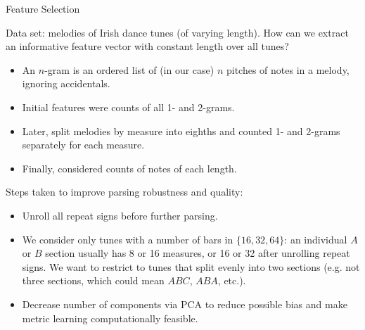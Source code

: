 \documentclass[letterpaper]{amsart}
\begin{document}
\begin{center}
\Huge
Feature Selection
\end{center}
\huge

Data set: melodies of Irish dance tunes (of varying length). How can we extract
an informative feature vector with constant length over all tunes?
\begin{itemize}
\item An $n$-gram is an ordered list of (in our case) $n$ pitches of notes in a melody, ignoring accidentals.

\item Initial features were counts of all 1- and 2-grams.

\item Later, split melodies by measure into eighths and counted 1- and 2-grams separately for each measure.

\item Finally, considered counts of notes of each length.
\end{itemize}

Steps taken to improve parsing robustness and quality:
\begin{itemize}
\item Unroll all repeat signs before further parsing.

\item We consider only tunes with a number of bars in $\{16, 32, 64\}$: an individual $A$ or $B$ section usually has 8 or 16 measures, or 16 or 32 after unrolling repeat signs. We want to restrict to tunes that split evenly into two sections (e.g. not three sections, which could mean $ABC$, $ABA$, etc.).

\item Decrease number of components via PCA to reduce possible bias and make metric learning computationally feasible.
\end{itemize}
\end{document}
